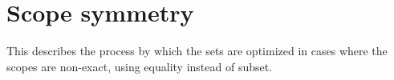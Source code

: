 

\section{Scope symmetry}


This describes the process by which the sets are optimized in cases where the scopes are non-exact, using equality instead of subset.